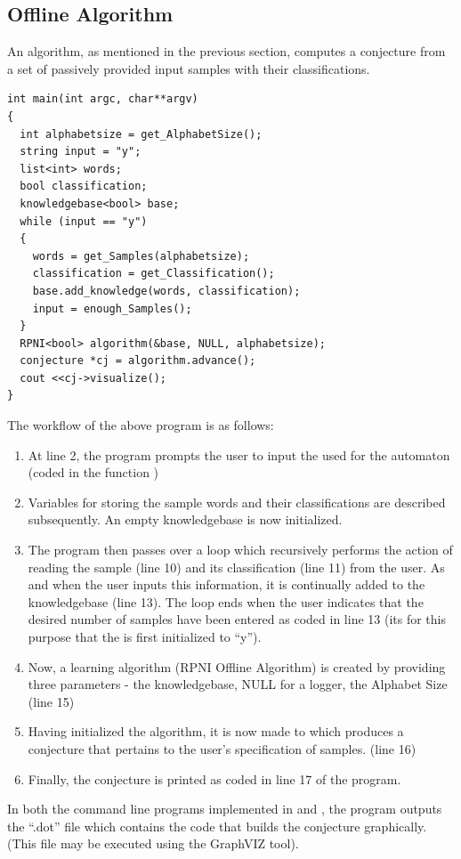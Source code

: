 \subsection{Offline Algorithm}

An \offline algorithm, as mentioned in the previous section, computes a conjecture from a set of passively provided input samples with their classifications.

\lstset{language=c++, numbers=left, numberstyle=\tiny, stepnumber=1, numbersep=5pt}
\begin{lstlisting}[frame=single]
int main(int argc, char**argv) 
{
  int alphabetsize = get_AlphabetSize();
  string input = "y";
  list<int> words;
  bool classification;
  knowledgebase<bool> base; 
  while (input == "y") 
  {
    words = get_Samples(alphabetsize);
    classification = get_Classification();
    base.add_knowledge(words, classification);
    input = enough_Samples();
  }
  RPNI<bool> algorithm(&base, NULL, alphabetsize);
  conjecture *cj = algorithm.advance();
  cout <<cj->visualize();
}
\end{lstlisting}

The workflow of the above program is as follows:

\begin{enumerate}

\item At line 2, the program prompts the user to input the \alphsize used for the automaton (coded in the function \getsize)
\item Variables for storing the sample words and their classifications are described subsequently. An empty knowledgebase is now initialized. 
\item The program then passes over a loop which recursively performs the action of reading the sample (line 10) and its classification (line 11) from the user. As and when the user inputs this information, it is continually added to the knowledgebase (line 13). The loop ends when the user indicates that the desired number of samples have been entered as coded in line 13 (its for this purpose that the \stringtype {} is first initialized to ``y'').
\item Now, a learning algorithm (RPNI Offline Algorithm) is created by providing three parameters - the knowledgebase, NULL for a logger, the Alphabet Size (line 15)
\item Having initialized the algorithm, it is now made to \advanced which produces a conjecture that pertains to the user's specification of samples. (line 16)
\item Finally, the conjecture is printed as coded in line 17 of the program.

\end{enumerate}

In both the command line programs implemented in \cpp and \java, the program outputs the ``.dot'' file which contains the code that builds the conjecture graphically. (This file may be executed using the GraphVIZ tool).


